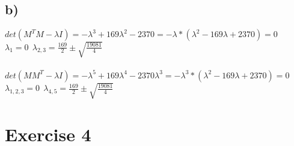 \documentclass[a4paper,10pt]{article}
\begin{document}
\subsection*{b)}
$ det(M^TM-\lambda I) = -\lambda^3 +169 \lambda^2 -2370 = -\lambda * (\lambda^2-169 \lambda +2370) =0 $ \\
$\lambda_1 =0 \ \ \lambda_{2,3}=\frac{169}{2} \pm \sqrt{\frac{19081}{4}}$ \\\\

$ det(MM^T-\lambda I) = -\lambda^5+169\lambda^4-2370\lambda^3 = -\lambda^3 * (\lambda^2-169 \lambda +2370) =0 $ \\
$\lambda_{1,2,3} =0 \ \ \lambda_{4,5}=\frac{169}{2} \pm \sqrt{\frac{19081}{4}}$
  

\section*{Exercise 4}
\end{document}
